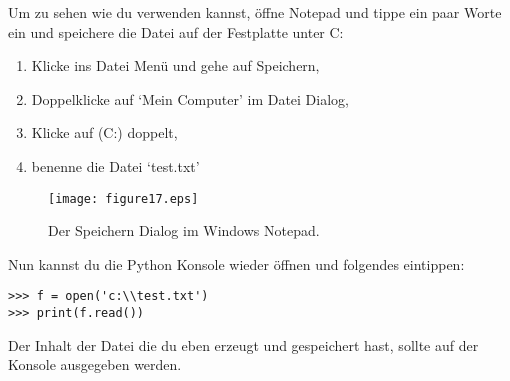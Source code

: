 \begin{WINDOWS}
Um zu sehen wie du  verwenden kannst, öffne Notepad und tippe ein paar Worte ein und speichere die Datei auf der Festplatte unter C:

\begin{enumerate}
 \item Klicke ins Datei Menü und gehe auf Speichern,
 \item Doppelklicke auf `Mein Computer' im Datei Dialog,
 \item Klicke auf (C:) doppelt,
 \item benenne die Datei `test.txt'
\end{enumerate}

\begin{figure}
\begin{center}
\texttt{[image: figure17.eps]}
\end{center}
\caption{Der Speichern Dialog im Windows Notepad.}\label{fig17}
\end{figure}

Nun kannst du die Python Konsole wieder öffnen und folgendes eintippen:

\begin{Verbatim}[frame=single]
>>> f = open('c:\\test.txt')
>>> print(f.read())
\end{Verbatim}

Der Inhalt der Datei die du eben erzeugt und gespeichert hast, sollte auf der Konsole ausgegeben werden. %
\end{WINDOWS}

